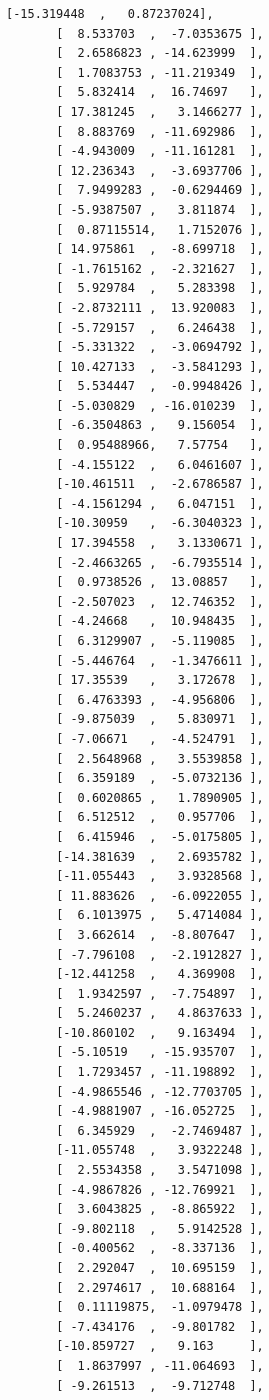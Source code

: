 \documentclass[11pt]{article}
\begin{document}
\begin{tcolorbox}[breakable, size=fbox, boxrule=.5pt, pad at break*=1mm, opacityfill=0]
\begin{Verbatim}[commandchars=\\\{\}]
       [-15.319448  ,   0.87237024],
       [  8.533703  ,  -7.0353675 ],
       [  2.6586823 , -14.623999  ],
       [  1.7083753 , -11.219349  ],
       [  5.832414  ,  16.74697   ],
       [ 17.381245  ,   3.1466277 ],
       [  8.883769  , -11.692986  ],
       [ -4.943009  , -11.161281  ],
       [ 12.236343  ,  -3.6937706 ],
       [  7.9499283 ,  -0.6294469 ],
       [ -5.9387507 ,   3.811874  ],
       [  0.87115514,   1.7152076 ],
       [ 14.975861  ,  -8.699718  ],
       [ -1.7615162 ,  -2.321627  ],
       [  5.929784  ,   5.283398  ],
       [ -2.8732111 ,  13.920083  ],
       [ -5.729157  ,   6.246438  ],
       [ -5.331322  ,  -3.0694792 ],
       [ 10.427133  ,  -3.5841293 ],
       [  5.534447  ,  -0.9948426 ],
       [ -5.030829  , -16.010239  ],
       [ -6.3504863 ,   9.156054  ],
       [  0.95488966,   7.57754   ],
       [ -4.155122  ,   6.0461607 ],
       [-10.461511  ,  -2.6786587 ],
       [ -4.1561294 ,   6.047151  ],
       [-10.30959   ,  -6.3040323 ],
       [ 17.394558  ,   3.1330671 ],
       [ -2.4663265 ,  -6.7935514 ],
       [  0.9738526 ,  13.08857   ],
       [ -2.507023  ,  12.746352  ],
       [ -4.24668   ,  10.948435  ],
       [  6.3129907 ,  -5.119085  ],
       [ -5.446764  ,  -1.3476611 ],
       [ 17.35539   ,   3.172678  ],
       [  6.4763393 ,  -4.956806  ],
       [ -9.875039  ,   5.830971  ],
       [ -7.06671   ,  -4.524791  ],
       [  2.5648968 ,   3.5539858 ],
       [  6.359189  ,  -5.0732136 ],
       [  0.6020865 ,   1.7890905 ],
       [  6.512512  ,   0.957706  ],
       [  6.415946  ,  -5.0175805 ],
       [-14.381639  ,   2.6935782 ],
       [-11.055443  ,   3.9328568 ],
       [ 11.883626  ,  -6.0922055 ],
       [  6.1013975 ,   5.4714084 ],
       [  3.662614  ,  -8.807647  ],
       [ -7.796108  ,  -2.1912827 ],
       [-12.441258  ,   4.369908  ],
       [  1.9342597 ,  -7.754897  ],
       [  5.2460237 ,   4.8637633 ],
       [-10.860102  ,   9.163494  ],
       [ -5.10519   , -15.935707  ],
       [  1.7293457 , -11.198892  ],
       [ -4.9865546 , -12.7703705 ],
       [ -4.9881907 , -16.052725  ],
       [  6.345929  ,  -2.7469487 ],
       [-11.055748  ,   3.9322248 ],
       [  2.5534358 ,   3.5471098 ],
       [ -4.9867826 , -12.769921  ],
       [  3.6043825 ,  -8.865922  ],
       [ -9.802118  ,   5.9142528 ],
       [ -0.400562  ,  -8.337136  ],
       [  2.292047  ,  10.695159  ],
       [  2.2974617 ,  10.688164  ],
       [  0.11119875,  -1.0979478 ],
       [ -7.434176  ,  -9.801782  ],
       [-10.859727  ,   9.163     ],
       [  1.8637997 , -11.064693  ],
       [ -9.261513  ,  -9.712748  ],

\end{Verbatim}
\end{tcolorbox}
\end{document}
